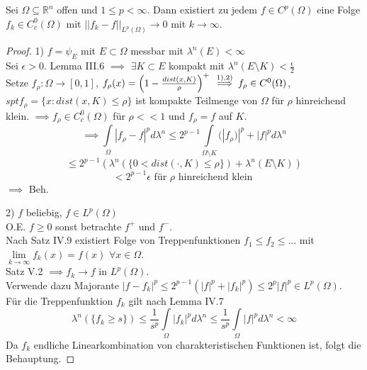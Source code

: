   \begin{theorem}
    Sei $\Omega \subseteq \mathbb{R}^n$ offen und $1 \leq p < \infty$. Dann existiert zu jedem $f \in C^p(\Omega)$ eine Folge $f_k \in C_c^0(\Omega)$ mit $|| f_k - f||_{L^p(\Omega)} \to 0$ mit $k \to \infty$.
  \end{theorem}

  \begin{proof}
    \item[1)] $f=\psi_E$ mit $E\subset \Omega$ messbar mit $\lambda^n(E) < \infty$\\
    Sei $\epsilon >0$. Lemma III.6 $\implies$ $\exists K\subset E$ kompakt mit $\lambda^n(E\setminus K) < \frac{\epsilon}{2}$ \\
    Setze $f_\rho: \Omega \to [0,1]$, $f_\rho (x) = \left( 1-\frac{dist(x,K)}{\rho}\right) ^+ \\ 
    \overset{\text{1),2)}}{\implies} f_\rho \in C^0(\Omega)$, $spt f_\rho = \{x: dist(x,K)\leq \rho \}$ ist kompakte Teilmenge von $\Omega$ für $\rho$ hinreichend klein. $\implies f_\rho \in C^0_c (\Omega)$ für $\rho << 1$ und $f_\rho = f$ auf $K$. \\
    $$\implies \int\limits_{\Omega} |f_\rho -f |^p d\lambda^n \leq 2^{p-1} \int\limits_{\Omega\setminus K} (|f_\rho)|^p + |f|^p d\lambda^n$$
    $$ \leq 2^{p-1} (\lambda^n (\{ 0< dist(\cdot, K)\leq \rho\}) + \lambda^n(E\setminus K))$$ 
    $$ < 2^{p-1}\epsilon \text{ für } \rho \text{ hinreichend klein }$$ 
    $\implies$ Beh. 
    \item[2)] $f$ beliebig, $f\in L^p(\Omega)$ \\
    O.E. $f \geq 0$ sonst betrachte $f^+$ und $f^-$. \\
    Nach Satz IV.9 existiert Folge von Treppenfunktionen $f_1 \leq f_2 \leq ...$ mit \\ $\lim\limits_{k\to\infty} f_k(x) = f(x)$ $\forall x\in \Omega$. \\
    Satz V.2 $\implies f_k \to f$ in $L^p(\Omega)$. \\
    Verwende dazu Majorante $|f-f_k|^p \leq 2^{p-1}(|f|^p+|f_k|^p) \leq 2^p |f|^p \in L^p(\Omega)$. \\
    Für die Treppenfunktion $f_k$ gilt nach Lemma IV.7
    $$ \lambda^n (\{f_k \geq s \}) \leq \frac{1}{s^p} \int\limits_\Omega |f_k|^p d\lambda^n \leq \frac{1}{s^p} \int\limits_\Omega |f|^p d\lambda^n < \infty$$ 
    Da $f_k$ endliche Linearkombination von charakteristischen Funktionen ist, folgt die Behauptung. 
  \end{proof}

